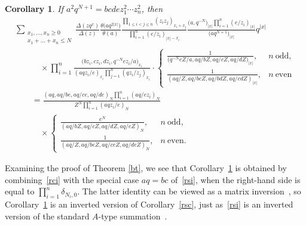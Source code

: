 \documentclass[pdftex]{sigma}
\numberwithin{equation}{section}
\newtheorem{Corollary}[Theorem]{Corollary}
\begin{document}
\begin{Corollary}\label{njc}
If $a^2q^{N+1}=bcdez_1^2\dotsm z_n^2$, then
\begin{gather*}
\sum_{\substack{x_1,\dots,x_n\geq 0\\x_1+\dots+x_n\leq N}}\frac{\Delta(zq^x)}{\Delta(z)}
\frac{\theta\big(aq^{2|x|}\big)}{\theta(a)}\frac{\prod\limits_{1\leq i<j\leq n}(z_iz_j)_{x_i+x_j}}{\prod\limits_{i=1}^n(e/z_i)_{|x|-x_i}}\frac{\big(a,q^{-N}\big)_{|x|}\prod\limits_{i=1}^n(e/z_i)_{|x|}}{\big(aq^{N+1}\big)_{|x|}} q^{|x|}\\
\qquad\quad{} \times\prod\limits_{i=1}^n\frac{\big(bz_i,cz_i,dz_i,q^{-N}ez_i/a\big)_{x_i}}{(aqz_i/e)_{x_i}\prod\limits_{j=1}^n(qz_i/z_j)_{x_i}}\cdot\begin{cases}
\displaystyle \frac 1{\big(q^{-N}eZ/a,aq/bZ,aq/cZ,aq/dZ\big)_{|x|}}, & n~\text{odd},\\[4mm]
\displaystyle \frac 1{(aq/Z,aq/bcZ,aq/bdZ,aq/cdZ)_{|x|}}, & n~\text{even}
\end{cases}\\
\qquad {} =\frac{(aq,aq/be,aq/ce,aq/de)_{N}\prod\limits_{i=1}^n(aq/ez_i)_N}{Z^N\prod\limits_{i=1}^n(aqz_i/e)_N}\\
\qquad\quad{}\times\begin{cases}
\displaystyle \frac {e^N}{(aq/bZ,aq/cZ,aq/dZ,aq/eZ)_{N}}, & n~\text{odd},\\[4mm]
\displaystyle \frac 1{(aq/Z,aq/beZ,aq/ceZ,aq/deZ)_{N}}, & n~\text{even}.
\end{cases}\end{gather*}
\end{Corollary}

 Examining the proof of Theorem \ref{bt}, we see that Corollary~\ref{njc} is obtained by combi\-ning~\eqref{rci} with the special case $aq=bc$ of~\eqref{rsi}, when the right-hand side is equal to $\prod\limits_{i=1}^n\delta_{N_i,0}$. The latter identity can be viewed as a matrix inversion~\cite{rs}, so Corollary~\ref{njc} is an inverted version of Corollary~\ref{rsc}, just as~\eqref{rsi} is an inverted version of the standard $A$-type summation~\cite[Corollary~5.2]{r}.
\end{document}
